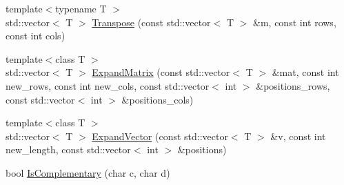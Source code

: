 \begin{DoxyCompactItemize}
\item 
{\footnotesize template$<$typename T $>$ }\\std\+::vector$<$ T $>$ \hyperlink{contrafold_2_utilities_8ipp_aca360a2e2018322c9ac6139cbafe3827}{Transpose} (const std\+::vector$<$ T $>$ \&m, const int rows, const int cols)
\item 
{\footnotesize template$<$class T $>$ }\\std\+::vector$<$ T $>$ \hyperlink{contrafold_2_utilities_8ipp_a4e494eed0ce3dbde725c013438efc02c}{Expand\+Matrix} (const std\+::vector$<$ T $>$ \&mat, const int new\+\_\+rows, const int new\+\_\+cols, const std\+::vector$<$ int $>$ \&positions\+\_\+rows, const std\+::vector$<$ int $>$ \&positions\+\_\+cols)
\item 
{\footnotesize template$<$class T $>$ }\\std\+::vector$<$ T $>$ \hyperlink{contrafold_2_utilities_8ipp_a3e4092b22afa5a8df86dcdafaefa74d0}{Expand\+Vector} (const std\+::vector$<$ T $>$ \&v, const int new\+\_\+length, const std\+::vector$<$ int $>$ \&positions)
\item 
bool \hyperlink{contrafold_2_utilities_8ipp_a97de122064ef1c636d8aa78953df68e1}{Is\+Complementary} (char c, char d)
\end{DoxyCompactItemize}


